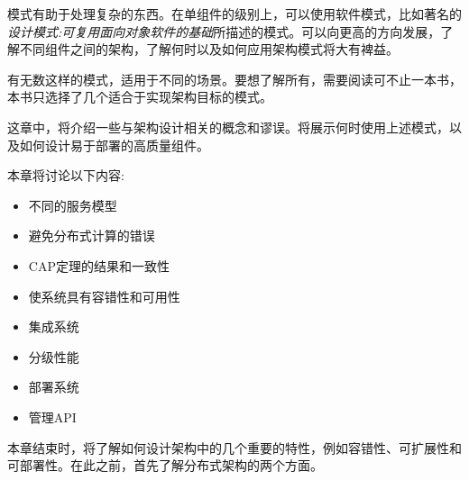 
模式有助于处理复杂的东西。在单组件的级别上，可以使用软件模式，比如著名的\textit{设计模式:可复用面向对象软件的基础}所描述的模式。可以向更高的方向发展，了解不同组件之间的架构，了解何时以及如何应用架构模式将大有裨益。

有无数这样的模式，适用于不同的场景。要想了解所有，需要阅读可不止一本书，本书只选择了几个适合于实现架构目标的模式。

这章中，将介绍一些与架构设计相关的概念和谬误。将展示何时使用上述模式，以及如何设计易于部署的高质量组件。

本章将讨论以下内容:

\begin{itemize}
\item 不同的服务模型
\item 避免分布式计算的错误
\item CAP定理的结果和一致性
\item 使系统具有容错性和可用性
\item 集成系统
\item 分级性能
\item 部署系统
\item 管理API
\end{itemize}

本章结束时，将了解如何设计架构中的几个重要的特性，例如容错性、可扩展性和可部署性。在此之前，首先了解分布式架构的两个方面。



























